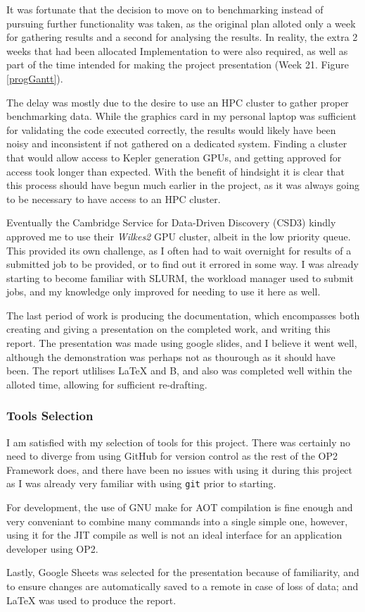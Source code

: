 It was fortunate that the decision to move on to benchmarking instead of pursuing further functionality was taken, as the original plan alloted only a week for gathering results and a second for analysing the results. In reality, the extra 2 weeks that had been allocated Implementation to were also required, as well as part of the time intended for making the project presentation (Week 21. Figure \ref{progGantt}).
\par
The delay was mostly due to the desire to use an HPC cluster to gather proper benchmarking data. While the graphics card in my personal laptop was sufficient for validating the code executed correctly, the results would likely have been noisy and inconsistent if not gathered on a dedicated system. Finding a cluster that would allow access to Kepler generation GPUs, and getting approved for access took longer than expected. With the benefit of hindsight it is clear that this process should have begun much earlier in the project, as it was always going to be necessary to have access to an HPC cluster.
\par
Eventually the Cambridge Service for Data-Driven Discovery (CSD3) kindly approved me to use their \textit{Wilkes2} GPU cluster, albeit in the low priority queue. This provided its own challenge, as I often had to wait overnight for results of a submitted job to be provided, or to find out it errored in some way. I was already starting to become familiar with SLURM, the workload manager used to submit jobs, and my knowledge only improved for needing to use it here as well.

The last period of work is producing the documentation, which encompasses both creating and giving a presentation on the completed work, and writing this report. The presentation was made using google slides, and I believe it went well, although the demonstration was perhaps not as thourough as it should have been. The report utlilises LaTeX and B, and also was completed well within the alloted time, allowing for sufficient re-drafting.

\subsubsection{Tools Selection}
I am satisfied with my selection of tools for this project. There was certainly no need to diverge from using GitHub for version control as the rest of the OP2 Framework does, and there have been no issues with using it during this project as I was already very familiar with using \verb|git| prior to starting.
\par
For development, the use of GNU make for AOT compilation is fine enough and very conveniant to combine many commands into a single simple one, however, using it for the JIT compile as well is not an ideal interface for an application developer using OP2.
\par
Lastly, Google Sheets was selected for the presentation because of familiarity, and to ensure changes are automatically saved to a remote in case of loss of data; and LaTeX was used to produce the report.
